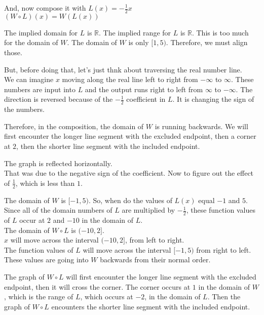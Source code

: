 \documentclass{ximera}
\begin{document}
And, now compose it with $L(x) = -\frac{1}{2}x$ \\



$(W \circ L)(x) = W(L(x))$


The implied domain for $L$ is \textbf{$\mathbb{R}$}.  The implied range for $L$ is \textbf{$\mathbb{R}$}. This is too much for the domain of $W$.  The domain of $W$ is only $[1, 5)$. Therefore, we must align those.

But, before doing that, let's just thnk about traversing the real number line. \\

We can imagine $x$ moving along the real line left to right from $-\infty$ to $\infty$. These numbers are input into $L$ and the output runs right to left from $\infty$ to $-\infty$.  The direction is reversed because of the $-\frac{1}{2}$ coefficient in $L$.  It is changing the sign of the numbers.


Therefore, in the composition, the domain of $W$ is running backwards.  We will first encounter the longer line segment with the excluded endpoint, then a corner at $2$, then the shorter line segment with the included endpoint.

The graph is reflected horizontally. \\


That was due to the negative sign of the coefficient.  Now to figure out the effect of $\frac{1}{2}$, which is less than $1$.


The domain of $W$ is $[-1, 5)$.  So, when do the values of $L(x)$ equal $-1$ and $5$.  Since all of the domain numbers of $L$ are multiplied by $-\frac{1}{2}$, these function values of $L$ occur at $2$ and $-10$ in the domain of $L$. \\



The domain of $W \circ L$ is $(-10, 2]$. \\



$x$ will move across the interval $(-10, 2]$, from left to right.  \\

The function values of $L$ will move across the interval $[-1, 5)$ from right to left.  These values are going into $W$ backwards from their normal order.

The graph of $W \circ L$ will first encounter the longer line segment with the excluded endpoint, then it will cross the corner.  The corner occurs at $1$ in the domain of $W$, which is the range of $L$, which occurs at $-2$, in the domain of $L$.  Then the graph of $W \circ L$ encounters the shorter line segment with the included endpoint. \\
\end{document}
